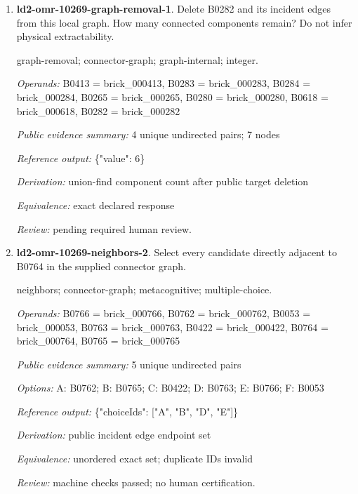 \begin{enumerate}
\par{\small neighbors; connector-graph; metacognitive; multiple-choice.\par\textit{Operands:} B0282 = brick\_000282, B0283 = brick\_000283, B0265 = brick\_000265, B0413 = brick\_000413, B0284 = brick\_000284, B0618 = brick\_000618, B0280 = brick\_000280\par\textit{Public evidence summary:} 4 unique undirected pairs\par\textit{Options:} A: B0280; B: B0283; C: B0265; D: B0618; E: B0284; F: B0413\par\textit{Reference output:} \{"choiceIds": ["A", "B", "C", "E"]\}\par\textit{Derivation:} public incident edge endpoint set\par\textit{Equivalence:} unordered exact set; duplicate IDs invalid\par\textit{Review:} pending required human review.}
\item \textbf{ld2-omr-10269-graph-removal-1}. Delete B0282 and its incident edges from this local graph. How many connected components remain? Do not infer physical extractability.
\par{\small graph-removal; connector-graph; graph-internal; integer.\par\textit{Operands:} B0413 = brick\_000413, B0283 = brick\_000283, B0284 = brick\_000284, B0265 = brick\_000265, B0280 = brick\_000280, B0618 = brick\_000618, B0282 = brick\_000282\par\textit{Public evidence summary:} 4 unique undirected pairs; 7 nodes\par\textit{Reference output:} \{"value": 6\}\par\textit{Derivation:} union-find component count after public target deletion\par\textit{Equivalence:} exact declared response\par\textit{Review:} pending required human review.}
\item \textbf{ld2-omr-10269-neighbors-2}. Select every candidate directly adjacent to B0764 in the supplied connector graph.
\par{\small neighbors; connector-graph; metacognitive; multiple-choice.\par\textit{Operands:} B0766 = brick\_000766, B0762 = brick\_000762, B0053 = brick\_000053, B0763 = brick\_000763, B0422 = brick\_000422, B0764 = brick\_000764, B0765 = brick\_000765\par\textit{Public evidence summary:} 5 unique undirected pairs\par\textit{Options:} A: B0762; B: B0765; C: B0422; D: B0763; E: B0766; F: B0053\par\textit{Reference output:} \{"choiceIds": ["A", "B", "D", "E"]\}\par\textit{Derivation:} public incident edge endpoint set\par\textit{Equivalence:} unordered exact set; duplicate IDs invalid\par\textit{Review:} machine checks passed; no human certification.}

\end{enumerate}

